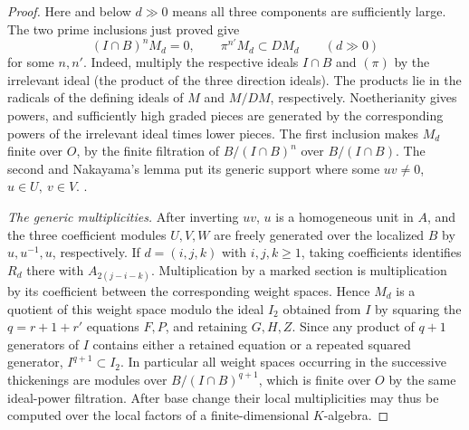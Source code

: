 \begin{proof}
Here and below \(d\gg0\) means all three components are sufficiently
large. The two prime inclusions just proved give
\[
 (I\cap B)^n M_d=0,\qquad \pi^{n'}M_d\subset D M_d
 \qquad(d\gg0)
\]
for some \(n,n'\). Indeed, multiply the respective ideals \(I\cap B\)
and \((\pi)\) by the irrelevant ideal (the product of the three
direction ideals). The products lie in the radicals of the defining
ideals of \(M\) and \(M/DM\), respectively. Noetherianity gives
powers, and sufficiently high graded pieces are generated by the
corresponding powers of the irrelevant ideal times lower pieces.
The first inclusion makes \(M_d\) finite over \(O\), by the finite
filtration of \(B/(I\cap B)^n\) over \(B/(I\cap B)\). The second
and Nakayama's lemma put its generic support where some
\(u v\ne0\), \(u\in U,\ v\in V\).
.

\emph{The generic multiplicities.}
After inverting \(uv\), \(u\) is a homogeneous unit in \(A\), and
the three coefficient modules \(U,V,W\) are freely generated over
the localized \(B\) by \(u,u^{-1},u\), respectively. If
\(d=(i,j,k)\) with \(i,j,k\ge1\), taking coefficients identifies
\(R_d\) there with \(A_{2(j-i-k)}\). Multiplication by a marked
section is multiplication by its coefficient between the corresponding
weight spaces. Hence \(M_d\) is a quotient of this weight space
modulo the ideal \(I_2\) obtained from \(I\) by squaring the
\(q=r+1+r'\) equations \(F,P\), and retaining \(G,H,Z\).
Since any product of \(q+1\) generators of \(I\) contains either
a retained equation or a repeated squared generator, \(I^{q+1}\subset I_2\).
In particular all weight spaces occurring in the successive
thickenings are modules over \(B/(I\cap B)^{q+1}\), which is finite
over \(O\) by the same ideal-power filtration. After base change
their local multiplicities may thus be computed over the local
factors of a finite-dimensional \(K\)-algebra.


\end{proof}
